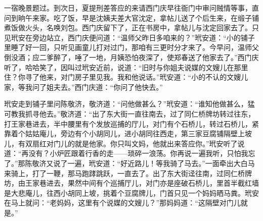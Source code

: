 一宿晚景题过。到次日，夏提刑差答应的来请西门庆早往衙门中审问贼情等事，直问到晌午来家。吃了饭，早是沈姨夫差大官沈定，拿帖儿送了个后生来，在缎子铺煮饭做火头，名唤刘包。西门庆留下了，正在书房中，拿帖儿与沈定回家去了。只见玳安在旁边站立，西门庆便问道：“温师父昨日多咱来的？”玳安道：“小的铺子里睡了好一回，只听见画童儿打对过门，那咱有三更时分才来了。今早问，温师父倒没酒；应二爹醉了，唾了一地，月姨恐怕夜深了，使郑春送了他家去了。”西门庆听了，哈哈笑了，因叫过玳安近前，说道：“旧时与你姐夫说媒的文嫂儿在那里住？你寻了他来，对门房子里见我。我和他说话。”玳安道：“小的不认的文嫂儿家，等我问了姐夫去。”西门庆道：“你问了他快去。”

玳安走到铺子里问陈敬济，敬济道：“问他做甚么？”玳安道：“谁知他做甚么，猛可教我抓寻他去。”敬济道：“出了东大街一直往南去，过了同仁桥牌坊转过往东，打王家巷进去，半中腰里有个发放巡捕的厅儿，对门有个石桥儿，转过石桥儿，紧靠着个姑姑庵儿，旁边有个小胡同儿，进小胡同往西走，第三家豆腐铺隔壁上坡儿，有双扇红对门儿的就是他家。你只叫文妈，他就出来答应你。”玳安听了说道：“再没有？小炉匠跟着行香的走——琐碎一浪荡。你再说一遍我听，只怕我忘了。”那陈敬济又说了一遍，玳安道：“好近路儿！等我骑了马去。”一面牵出大白马来骑上，打了一鞭，那马跑踍跳跃，一直去了。出了东大街迳往南，过同仁桥牌坊，由王家巷进去，果然中间有个巡捕厅儿，对门亦是座破石桥儿，里首半截红墙是大悲庵儿，往西小胡同上坡，挑着个豆腐牌儿，门首只见一个妈妈晒马粪。玳安在马上就问：“老妈妈，这里有个说媒的文嫂儿？”那妈妈道：“这隔壁对门儿就是。”

